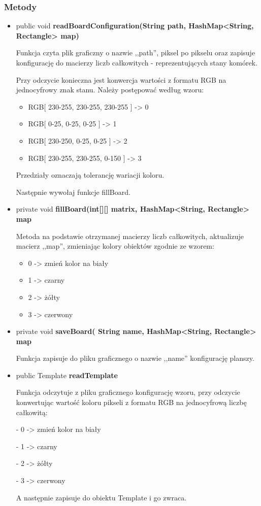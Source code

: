 \documentclass[a4paper,11pt]{article}
\begin{document}
\subsubsection{Metody}
\begin{itemize}
\item public void \textbf{readBoardConfiguration(String path, HashMap<String, Rectangle> map)}

Funkcja czyta plik graficzny o nazwie ,,path'', piksel po pikselu oraz zapisuje konfigurację do macierzy liczb całkowitych - reprezentujących stany komórek. 

Przy odczycie konieczna jest konwercja wartości z formatu RGB na jednocyfrowy znak stanu. Należy postępować według wzoru:
\begin{itemize}
\item RGB[ 230-255, 230-255, 230-255 ] -> 0
\item RGB[ 0-25, 0-25, 0-25 ] -> 1
\item RGB[ 230-250, 0-25, 0-25 ] -> 2
\item RGB[ 230-255, 230-255, 0-150 ] -> 3
\end{itemize}

Przedziały oznaczają tolerancję wariacji koloru.

Następnie wywołaj funkcje fillBoard.

\item private void \textbf{fillBoard(int[][] matrix, HashMap<String, Rectangle> map}

Metoda na podstawie otrzymanej macierzy liczb całkowitych, aktualizuje macierz ,,map'', zmieniając kolory obiektów zgodnie ze wzorem:
\begin{itemize}
\item 0 -> zmień kolor na biały
\item 1 -> czarny
\item 2 -> żółty
\item 3 -> czerwony
\end{itemize}

\item private void \textbf{saveBoard( String name, HashMap<String, Rectangle> map }

Funkcja zapisuje do pliku graficznego o nazwie ,,name'' konfigurację planszy.
\item public Template \textbf{readTemplate}

Funkcja odczytuje z pliku graficznego konfigurację wzoru, przy odczycie konwertując wartość koloru pikseli z formatu RGB na jednocyfrową liczbę całkowitą:

- 0 -> zmień kolor na biały

- 1 -> czarny

- 2 -> żółty

- 3 -> czerwony

A następnie zapisuje do obiektu Template i go zwraca. 
\end{itemize}
\end{document}
